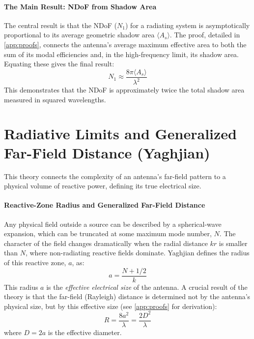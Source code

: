 \documentclass[11pt, a4paper]{report}
\begin{document}
\paragraph{The Main Result: NDoF from Shadow Area}
The central result is that the NDoF ($N_1$) for a radiating system is asymptotically proportional to its average geometric shadow area $\langle A_s \rangle$. The proof, detailed in \cref{app:proofs}, connects the antenna's average maximum effective area to both the sum of its modal efficiencies and, in the high-frequency limit, its shadow area. Equating these gives the final result:
\begin{equation}
    N_1 \approx \frac{8\pi \langle A_s \rangle}{\lambda^2}
\end{equation}
This demonstrates that the NDoF is approximately twice the total shadow area measured in squared wavelengths.

\section{Radiative Limits and Generalized Far-Field Distance (Yaghjian)}
This theory connects the complexity of an antenna's far-field pattern to a physical volume of reactive power, defining its true electrical size.

\paragraph{Reactive-Zone Radius and Generalized Far-Field Distance}
Any physical field outside a source can be described by a spherical-wave expansion, which can be truncated at some maximum mode number, $N$. The character of the field changes dramatically when the radial distance $kr$ is smaller than $N$, where non-radiating reactive fields dominate. Yaghjian defines the radius of this reactive zone, $a$, as:
\begin{equation}
    a = \frac{N + 1/2}{k}
\end{equation}
This radius $a$ is the \textit{effective electrical size} of the antenna. A crucial result of the theory is that the far-field (Rayleigh) distance is determined not by the antenna's physical size, but by this effective size (see \cref{app:proofs} for derivation):
\begin{equation}
    R = \frac{8a^2}{\lambda} = \frac{2D^2}{\lambda}
\end{equation}
where $D=2a$ is the effective diameter.

\newpage
\end{document}
